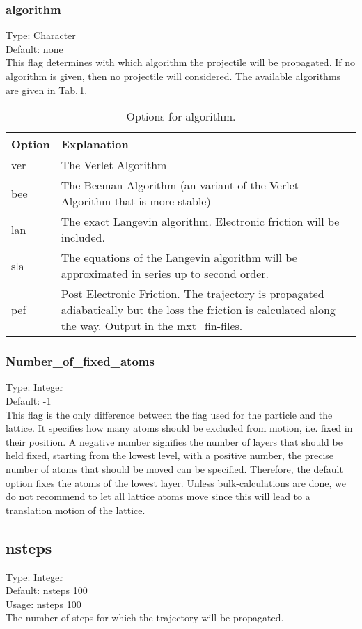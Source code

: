 \documentclass[twoside, 11pt, titlepage, captions=nooneline, a4paper, headsepline]{scrbook}%
\begin{document}
\subsubsection*{algorithm}
Type: Character\\
Default: none\\
This flag determines with which algorithm the projectile will be propagated. If no algorithm is given, then no projectile will considered. The available algorithms are given in Tab.\,\ref{algo1}.\\
\begin{table}[h!]
\centering
\caption{Options for algorithm.}
\label{algo1}
\begin{tabular}{p{2cm}p{11cm}}
\hline\hline
Option&Explanation\\
\hline
ver & The Verlet Algorithm\\
bee & The Beeman Algorithm (an variant of the Verlet Algorithm that is more stable)\\
lan & The exact Langevin algorithm. Electronic friction will be included.\\
sla & The equations of the Langevin algorithm will be approximated in series up to second order.\\
pef& Post Electronic Friction. The trajectory is propagated adiabatically but the loss the friction is calculated along the way. Output in the mxt\_fin-files.\\
\hline
\end{tabular}
\end{table}
\subsubsection*{Number\_of\_fixed\_atoms}
Type: Integer\\
Default: -1\\
This flag is the only difference between the flag used for the particle and the lattice. It specifies how many atoms should be excluded from motion, i.e. fixed in their position. A negative number signifies the number of layers that should be held fixed, starting from the lowest level, with a positive number, the precise number of atoms that should be moved can be specified. Therefore, the default option fixes the atoms of the lowest layer. Unless bulk-calculations are done, we do not recommend to let all lattice atoms move since this will lead to a translation motion of the lattice.

\subsection*{nsteps}
Type: Integer\\
Default: nsteps 100\\
Usage: nsteps 100\\
The number of steps for which the trajectory will be propagated.
\end{document}
